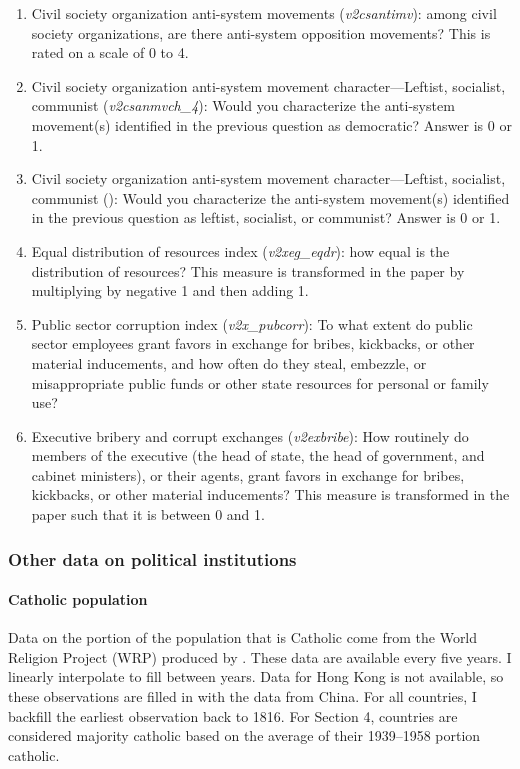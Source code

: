 \begin{enumerate}
	\item Civil society organization anti-system movements (\textit{v2csantimv}): among civil society organizations, are there anti-system opposition movements?  This is rated on a scale of 0 to 4.
	\item Civil society organization anti-system movement character---Leftist, socialist, communist (\textit{v2csanmvch\_4}): Would you characterize the anti-system movement(s) identified in the previous question as democratic? Answer is 0 or 1.
	\item Civil society organization anti-system movement character---Leftist, socialist, communist (): Would you characterize the anti-system movement(s) identified in the previous question as leftist, socialist, or communist? Answer is 0 or 1.
	\item Equal distribution of resources index (\textit{v2xeg\_eqdr}): how equal is the distribution of resources? This measure is transformed in the paper by multiplying by negative 1 and then adding 1.
	\item Public sector corruption index (\textit{v2x\_pubcorr}): To what extent do public sector employees grant favors in exchange for bribes, kickbacks, or other material inducements, and how often do they steal, embezzle, or misappropriate public funds or other state resources for personal or family use?
	\item Executive bribery and corrupt exchanges (\textit{v2exbribe}): How routinely do members of the executive (the head of state, the head of government, and cabinet ministers), or their agents, grant favors in exchange for bribes, kickbacks, or other material inducements? This measure is transformed in the paper such that it is between 0 and 1.
\end{enumerate}

\subsubsection{Other data on political institutions}\label{section:otherpolinst}

\paragraph{Catholic population}
Data on the portion of the population that is Catholic come from the World Religion Project (WRP) produced by \cite{Maoz2013}. These data are available every five years. I linearly interpolate to fill between years. Data for Hong Kong is not available, so these observations are filled in with the data from China. For all countries, I backfill the earliest observation back to 1816. For Section 4, countries are considered majority catholic based on the average of their 1939--1958 portion catholic.

